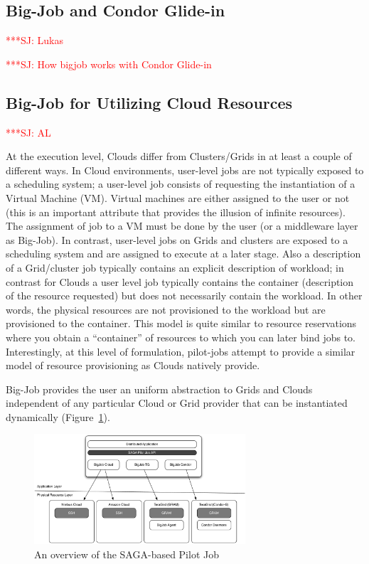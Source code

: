 \documentclass[conference,final]{IEEEtran}
\newcommand{\jhanote}[1]{ {\textcolor{red} { ***SJ: #1 }}}
\newcommand{\jhanote}[1]{}
\begin{document}
\subsection{Big-Job and Condor Glide-in} \jhanote{Lukas}

\jhanote{How bigjob works with Condor Glide-in}

\subsection{Big-Job for Utilizing Cloud Resources} \jhanote{AL}


At the execution level, Clouds differ from Clusters/Grids in at least
a couple of different ways. In Cloud environments, user-level jobs are
not typically exposed to a scheduling system; a user-level job
consists of requesting the instantiation of a Virtual Machine (VM).
Virtual machines are either assigned to the user or not (this is an
important attribute that provides the illusion of infinite resources).
The assignment of job to a VM must be done by the user (or a
middleware layer as Big-Job).  In contrast, user-level jobs on Grids
and clusters are exposed to a scheduling system and are assigned to
execute at a later stage.  Also a description of a Grid/cluster job
typically contains an explicit description of workload; in contrast
for Clouds a user level job typically contains the container
(description of the resource requested) but does not necessarily
contain the workload. In other words, the physical resources are
not provisioned to the workload but are provisioned to the container.
This model is quite similar to resource reservations where you obtain
a ``container'' of resources to which you can later bind jobs
to. Interestingly, at this level of formulation, pilot-jobs attempt to
provide a similar model of resource provisioning as Clouds natively
provide.

Big-Job provides the user an uniform abstraction to Grids and Clouds
independent of any particular Cloud or Grid provider that can be
instantiated dynamically
(Figure~\ref{fig:figures_distributed_pilot_job}).

\begin{figure}[htbp]
    \centering
        \includegraphics[width=0.7\textwidth]{figures/distributed_pilot_job.pdf}
    \caption{An overview of the SAGA-based Pilot Job}
    \label{fig:figures_distributed_pilot_job}
\end{figure}
\end{document}
